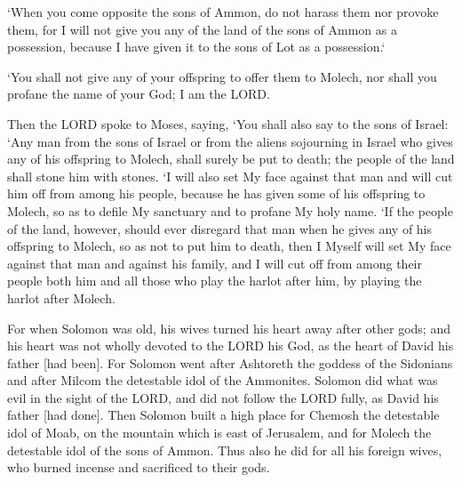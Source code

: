 \begin{scripture}[Deuteronomy 2:19]
    `When you come opposite the sons of Ammon, do not harass them nor provoke them, for I will not give you any of the land of the sons of Ammon as a possession, because I have given it to the sons of Lot as a possession.`
\end{scripture}

\begin{scripture}[Leviticus 18:21]
    `You shall not give any of your offspring to offer them to Molech, nor shall you profane the name of your God; I am the LORD.
\end{scripture}

\begin{scripture}[Leviticus 20:1-5]
    Then the LORD spoke to Moses, saying,
    `You shall also say to the sons of Israel: `Any man from the sons of Israel or from the aliens sojourning in Israel who gives any of his offspring to Molech, shall surely be put to death; the people of the land shall stone him with stones.
    `I will also set My face against that man and will cut him off from among his people, because he has given some of his offspring to Molech, so as to defile My sanctuary and to profane My holy name.
    `If the people of the land, however, should ever disregard that man when he gives any of his offspring to Molech, so as not to put him to death,
    then I Myself will set My face against that man and against his family, and I will cut off from among their people both him and all those who play the harlot after him, by playing the harlot after Molech.
\end{scripture}

\begin{scripture}[1 Kings 11:4-8]
    For when Solomon was old, his wives turned his heart away after other gods; and his heart was not wholly devoted to the LORD his God, as the heart of David his father [had been].
    For Solomon went after Ashtoreth the goddess of the Sidonians and after Milcom the detestable idol of the Ammonites.
    Solomon did what was evil in the sight of the LORD, and did not follow the LORD fully, as David his father [had done].
    Then Solomon built a high place for Chemosh the detestable idol of Moab, on the mountain which is east of Jerusalem, and for Molech the detestable idol of the sons of Ammon.
    Thus also he did for all his foreign wives, who burned incense and sacrificed to their gods.
\end{scripture}

